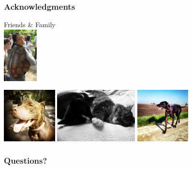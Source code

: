\begin{frame}[t]
    \frametitle{Acknowledgments}
    \begin{center}
    Friends \& Family \\
    \bigskip
    \includegraphics[height=2.8cm]{../images/photos/mel.jpg}

    \smallskip
    \includegraphics[height=2.8cm]{../images/photos/coop.jpg}\hspace{1mm}
    \includegraphics[height=2.8cm]{../images/photos/cats.jpg}\hspace{1mm}
    \includegraphics[height=2.8cm]{../images/photos/luna.jpg}
    \end{center}
\end{frame}

{
\begin{frame}
    \frametitle{Questions?}    
\end{frame}
}

